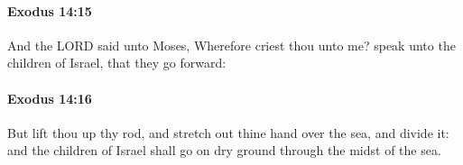 		\paragraph{Exodus 14:15} %
			\label{EXODUS-14-15}

			And the LORD said unto Moses, Wherefore criest thou unto me? speak unto the children of Israel, that they go forward:


		\paragraph{Exodus 14:16} %
			\label{EXODUS-14-16}

			But lift thou up thy rod, and stretch out thine hand over the sea, and divide it: and the children of Israel shall go on dry ground through the midst of the sea.


